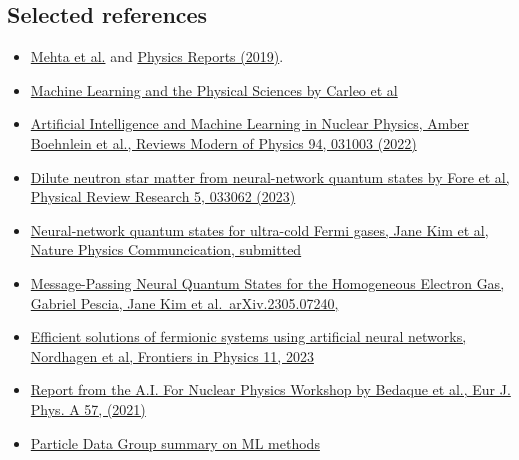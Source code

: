 \documentclass[%
oneside,                 %
final,                   %
10pt]{article}
\begin{document}
\subsection{Selected references}
\begin{block}{}
\begin{itemize}
\item \href{{https://arxiv.org/abs/1803.08823}}{Mehta et al.} and \href{{https://www.sciencedirect.com/science/article/pii/S0370157319300766?via%3Dihub}}{Physics Reports (2019)}.

\item \href{{https://link.aps.org/doi/10.1103/RevModPhys.91.045002}}{Machine Learning and the Physical Sciences by Carleo et al}

\item \href{{https://journals.aps.org/rmp/abstract/10.1103/RevModPhys.94.031003}}{Artificial Intelligence and Machine Learning in Nuclear Physics, Amber Boehnlein et al., Reviews Modern of Physics 94, 031003 (2022)} 

\item \href{{https://journals.aps.org/prresearch/pdf/10.1103/PhysRevResearch.5.033062}}{Dilute neutron star matter from neural-network quantum states by Fore et al, Physical Review Research 5, 033062 (2023)}

\item \href{{https://doi.org/10.48550/arXiv.2305.08831}}{Neural-network quantum states for ultra-cold Fermi gases, Jane Kim et al, Nature Physics Communcication, submitted}

\item \href{{https://doi.org/10.48550/arXiv.2305.07240}}{Message-Passing Neural Quantum States for the Homogeneous Electron Gas, Gabriel Pescia, Jane Kim et al.~arXiv.2305.07240,}

\item \href{{https://doi.org/10.3389/fphy.2023.1061580}}{Efficient solutions of fermionic systems using artificial neural networks, Nordhagen et al, Frontiers in Physics 11, 2023}

\item \href{{https://link.springer.com/article/10.1140/epja/s10050-020-00290-x}}{Report from the A.I. For Nuclear Physics  Workshop by Bedaque et al., Eur J. Phys. A 57, (2021)}

\item \href{{https://pdg.lbl.gov/2021/reviews/rpp2021-rev-machine-learning.pdf}}{Particle Data Group summary on ML methods}
\end{itemize}

\noindent
\end{block}
\end{document}
